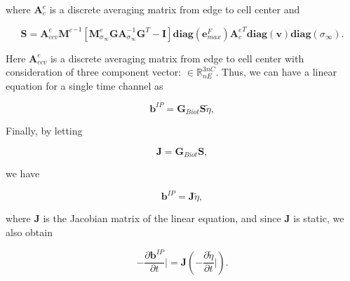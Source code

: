\documentclass[extra,mreferee]{gji}
\newcommand{\siginf}{\sigma_\infty}
\newcommand{\Ace}{{\mathbf A_c^e}}
\newcommand{\diag}{\mathbf{diag}}
\newcommand{\M}{{\mathbf M}}
\newcommand{\MeSigInf}{{\M^e_{\sigma_\infty}}}
\newcommand{\Me}{{\M^e}}
\newcommand {\db}  { {\mathbf{b} } }
\newcommand {\de}  { {\mathbf{e} } }
\newcommand{\vol}{\mathbf{v}}
\newcommand{\A}{\mathbf{A}}
\newcommand{\Gbiot}{\mathbf{G}_{Biot}}
\newcommand{\peta}{\tilde{\eta}}
\begin{document}
where $\mathbf{A}^{e}_{c}$ is a discrete averaging matrix from edge to cell center and
\begin{linenomath*}
\begin{equation}
  \mathbf{S} = \mathbf{A}^{e}_{ccv}\Me^{-1}[\MeSigInf \mathbf{G} \A_{\siginf}^{-1}\mathbf{G}^T  - \mathbf{I}] \diag(\de^{F}_{max})\Ace^T\diag(\vol)\diag(\siginf).
\end{equation}
\end{linenomath*}
Here $\mathbf{A}^{e}_{ccv}$ is a discrete averaging matrix from edge to cell center with consideration of three component vector: $\in \mathbb{R}^{3nC}_{nE}$.
Thus, we can have a linear equation for a single time channel as
\begin{linenomath*}
\begin{equation*}
  \db^{IP} = \Gbiot \mathbf{S} \peta,
\end{equation*}
\end{linenomath*}
Finally, by letting
\begin{linenomath*}
\begin{equation}
  \mathbf{J} = \Gbiot\mathbf{S},
  \label{eq: Sense}
\end{equation}
\end{linenomath*}
we have
\begin{linenomath*}
\begin{equation}
  \db^{IP} = \mathbf{J}\peta,
  \label{eq: bIP_linear}
\end{equation}
\end{linenomath*}
where $\mathbf{J}$ is the Jacobian matrix of the linear equation, and since $\mathbf{J}$ is static, we also obtain
\begin{linenomath*}
\begin{equation}
  -\frac{\partial\db^{IP}}{\partial t}\Big| = \mathbf{J}(-\frac{\partial \peta}{\partial t}\Big|).
  \label{eq: dbIPdt_linear}
\end{equation}
\end{linenomath*}

\clearpage
\end{document}
